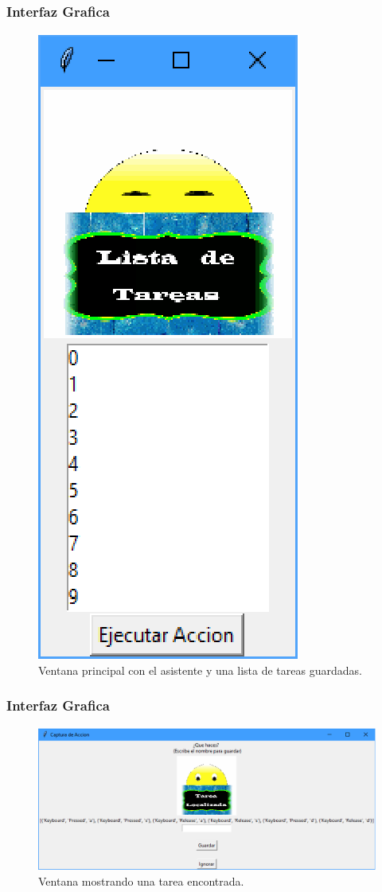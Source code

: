 \begin{frame}
\frametitle{Interfaz Grafica}

\begin{figure}[H]
\centering
\includegraphics[width=0.2\columnwidth]{Imagenes/ventana1.eps}
\caption{Ventana principal con el asistente y una lista de tareas
 guardadas.}
\label{fig:v01}
\end{figure} 

\end{frame}


\begin{frame}
\frametitle{Interfaz Grafica}

\begin{figure}[H]
\centering
\includegraphics[width=1.0\columnwidth]{Imagenes/ventana2.eps}
\caption{Ventana mostrando una tarea encontrada.}
\label{fig:v02}
\end{figure}

\end{frame}
